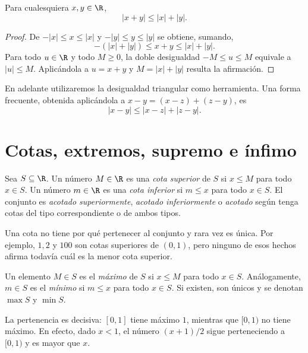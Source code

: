 \begin{proposicion}
Para cualesquiera \(x,y\in\R\),
\[
  |x+y|\le |x|+|y|.
\]
\end{proposicion}

\begin{proof}
De \(-|x|\le x\le |x|\) y \(-|y|\le y\le |y|\) se obtiene, sumando,
\[
  -(|x|+|y|)\le x+y\le |x|+|y|.
\]
Para todo \(u\in\R\) y todo \(M\ge0\), la doble desigualdad
\(-M\le u\le M\) equivale a \(|u|\le M\). Aplicándola a
\(u=x+y\) y \(M=|x|+|y|\) resulta la afirmación.
\end{proof}

En adelante utilizaremos la desigualdad triangular como herramienta. Una forma
frecuente, obtenida aplicándola a \(x-y=(x-z)+(z-y)\), es
\[
  |x-y|\le |x-z|+|z-y|.
\]

\section{Cotas, extremos, supremo e ínfimo}
\label{sec:cotas-extremos}

\begin{definicion}[Cotas]
Sea \(S\subseteq\R\). Un número \(M\in\R\) es una \emph{cota superior} de
\(S\) si \(x\le M\) para todo \(x\in S\). Un número \(m\in\R\) es una
\emph{cota inferior} si \(m\le x\) para todo \(x\in S\). El conjunto es
\emph{acotado superiormente}, \emph{acotado inferiormente} o
\emph{acotado} según tenga cotas del tipo correspondiente o de ambos tipos.
\end{definicion}

Una cota no tiene por qué pertenecer al conjunto y rara vez es única. Por
ejemplo, \(1,2\) y \(100\) son cotas superiores de \((0,1)\), pero ninguno de
esos hechos afirma todavía cuál es la menor cota superior.

\begin{definicion}
Un elemento \(M\in S\) es el \emph{máximo} de \(S\) si \(x\le M\) para todo
\(x\in S\). Análogamente, \(m\in S\) es el \emph{mínimo} si \(m\le x\) para
todo \(x\in S\). Si existen, son únicos y se denotan \(\max S\) y \(\min S\).
\end{definicion}

La pertenencia es decisiva: \([0,1]\) tiene máximo \(1\), mientras que
\([0,1)\) no tiene máximo. En efecto, dado \(x<1\), el número
\((x+1)/2\) sigue perteneciendo a \([0,1)\) y es mayor que \(x\).

